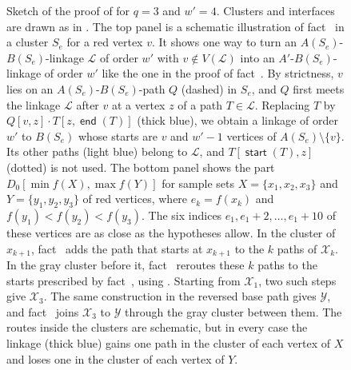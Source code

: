 \documentclass[fontsize=12pt,leading=14pt]{fullpaper}
\DeclareMathOperator{\st}{\mathsf{start}}
\DeclareMathOperator{\en}{\mathsf{end}}
\newcommand{\Lcal}{\mathcal{L}}
\newcommand{\Xcal}{\mathcal{X}}
\newcommand{\Ycal}{\mathcal{Y}}
\newcounter{step}
\begin{document}
\begin{figure}[ht]
  \caption{Sketch of the proof of  for $q=3$ and $w'=4$.
    Clusters and interfaces are drawn as in .
    The top panel is a schematic illustration of fact~ in a cluster $S_e$ for a red vertex $v$.
    It shows one way to turn an $A(S_e)$-$B(S_e)$-linkage $\Lcal$ of order $w'$ with $v\notin V(\Lcal)$ into an $A'$-$B(S_e)$-linkage of order $w'$ like the one in the proof of fact~.
    By strictness, $v$ lies on an $A(S_e)$-$B(S_e)$-path $Q$ (dashed) in $S_e$, and $Q$ first meets the linkage $\Lcal$ after $v$ at a vertex $z$ of a path $T\in\Lcal$.
    Replacing $T$ by $Q[v,z]\cdot T[z,\en(T)]$ (thick blue), we obtain a linkage of order $w'$ to $B(S_e)$ whose starts are $v$ and $w'-1$ vertices of $A(S_e)\setminus\{v\}$.
    Its other paths (light blue) belong to $\Lcal$, and $T[\st(T),z]$ (dotted) is not used.
    The bottom panel shows the part $D_0[\min f(X),\max f(Y)]$ for sample sets $X=\{x_1,x_2,x_3\}$ and $Y=\{y_1,y_2,y_3\}$ of red vertices, where $e_k=f(x_k)$ and $f(y_1)<f(y_2)<f(y_3)$.
    The six indices $e_1,e_1+2,\dots,e_1+10$ of these vertices are as close as the hypotheses allow.
    In the cluster of $x_{k+1}$, fact~ adds the path that starts at $x_{k+1}$ to the $k$ paths of $\Xcal_k$.
    In the gray cluster before it, fact~ reroutes these $k$ paths to the starts prescribed by fact~, using .
    Starting from $\Xcal_1$, two such steps give $\Xcal_3$.
    The same construction in the reversed base path gives $\Ycal$, and fact~ joins $\Xcal_3$ to $\Ycal$ through the gray cluster between them.
  The routes inside the clusters are schematic, but in every case the linkage (thick blue) gains one path in the cluster of each vertex of $X$ and loses one in the cluster of each vertex of $Y$.}
  \label{fig:stage2-spaced}
\end{figure}
\end{document}
